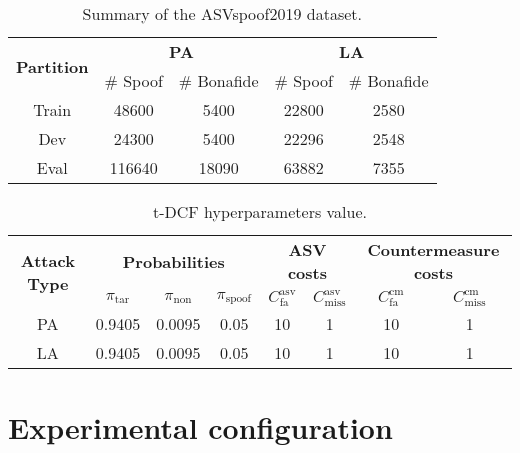 \documentclass[a4paper]{article}
\begin{document}
\begin{table}[H]
\caption{Summary of the ASVspoof2019 dataset.}
\centering
\begin{tabular}{|c|cc|cc|}
\hline
\multirow{2}{*}{\textbf{Partition}} & \multicolumn{2}{c|}{\textbf{PA}} & \multicolumn{2}{c|}{\textbf{LA}} \\ 
   & \# Spoof& \# Bonafide& \# Spoof& \# Bonafide \\ \hline
Train & \multicolumn{1}{c|}{48600}& \multicolumn{1}{c|}{5400}& \multicolumn{1}{c|}{22800}& \multicolumn{1}{c|}{2580}\\\hline
Dev & \multicolumn{1}{c|}{24300}& \multicolumn{1}{c|}{5400}& \multicolumn{1}{c|}{22296}& \multicolumn{1}{c|}{2548}\\\hline
Eval & \multicolumn{1}{c|}{116640}& \multicolumn{1}{c|}{18090}& \multicolumn{1}{c|}{63882}& \multicolumn{1}{c|}{7355}\\\hline
\end{tabular}
\label{tab:dataset}
\end{table}
\begin{table*}[th]
\centering
\caption{t-DCF hyperparameters value.}
\begin{tabular}{|c|ccc|cc|cc|}
\hline
\multirow{2}{*}{\textbf{Attack Type}} & \multicolumn{3}{c|}{\textbf{Probabilities}} & \multicolumn{2}{c|}{\textbf{ASV costs}} & \multicolumn{2}{c|}{\textbf{Countermeasure costs}} \\ 
   & $\pi_{\mathrm{tar}}$                           & $\pi_{\mathrm{non}}$                           & $\pi_{\mathrm{spoof}}$    & $C_{\mathrm{fa}}^{\mathrm{asv}}$  & $C_{\mathrm{miss}}^{\mathrm{asv}}$ & $C_{\mathrm{fa}}^{\mathrm{cm}}$  & $C_{\mathrm{miss}}^{\mathrm{cm}}$ \\ \hline
PA & \multicolumn{1}{c|}{0.9405} & \multicolumn{1}{c|}{0.0095} & 0.05 & 10 & 1 & 10 & 1 \\ \hline
LA & \multicolumn{1}{c|}{0.9405} & \multicolumn{1}{c|}{0.0095} & 0.05 & 10 & 1 & 10 & 1 \\ \hline
\end{tabular}
\label{tab:datasethyperparam}
\end{table*}
\section{Experimental configuration}
\end{document}
